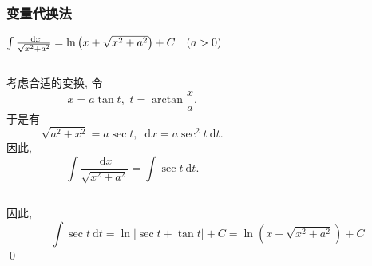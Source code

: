 \documentclass[
10pt,
aspectratio=43,
]{beamer}
\begin{document}
\begin{frame}
	\frametitle{变量代换法}
	\everymath{\displaystyle}
	{\small
		\begin{exampleblock}{$\color{black}\int \frac{\mathrm{~d} x}{\sqrt{x^2+a^2}}=\ln \left(x+\sqrt{x^2+a^2}\right)+C \quad(a>0)$}
			\begin{columns}
				\begin{column}{0.4\textwidth}
					\pause 考虑合适的变换, 令
					$$
						x=a \tan t,\,\,t=\arctan\frac{x}{a}.
					$$
					\pause 于是有
					$$
						\sqrt{a^2+x^2} = a\sec t,\,\,\mathrm{~d} x=a \sec ^2 t \mathrm{~d} t.
					$$
					\pause 因此,
					$$
						\int \frac{\mathrm{~d} x}{\sqrt{x^2+a^2}}=\int \sec t \mathrm{~d} t.
					$$
				\end{column}
				\pause
				\begin{column}{0.5\textwidth}
					\begin{figure}
						\centering
					\end{figure}
				\end{column}
			\end{columns}
			\vspace{0.1cm}
			\pause
			因此,
			$$
				\int \sec t \mathrm{~d} t= \ln |\sec t+\tan t|+C=\ln \left(x+\sqrt{x^2+a^2}\right)+C
			$$
			\qed
		\end{exampleblock}
	}
\end{frame}
\end{document}
